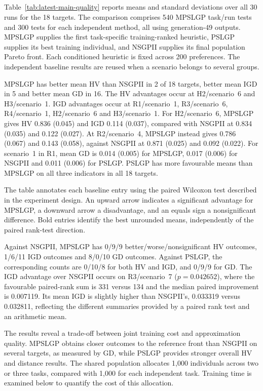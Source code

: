 \subsection{}
Table~\ref{tab:latest-main-quality} reports means and standard deviations over all 30 runs for the 18 targets. The comparison comprises 540 MPSLGP task/run tests and 300 tests for each independent method, all using generation-49 outputs. MPSLGP supplies the first task-specific training-ranked heuristic, PSLGP supplies its best training individual, and NSGPII supplies its final population Pareto front. Each conditioned heuristic is fixed across 200 preferences. The independent baseline results are reused when a scenario belongs to several groups.

MPSLGP has better mean HV than NSGPII in 2 of 18 targets, better mean IGD in 5 and better mean GD in 16. The HV advantages occur at H2/scenario~6 and H3/scenario~1. IGD advantages occur at R1/scenario~1, R3/scenario~6, R4/scenario~1, H2/scenario~6 and H3/scenario~1. For H2/scenario~6, MPSLGP gives HV 0.836 (0.045) and IGD 0.114 (0.037), compared with NSGPII at 0.834 (0.035) and 0.122 (0.027). At R2/scenario~4, MPSLGP instead gives 0.786 (0.067) and 0.143 (0.058), against NSGPII at 0.871 (0.025) and 0.092 (0.022). For scenario~1 in R1, mean GD is 0.014 (0.005) for MPSLGP, 0.017 (0.006) for NSGPII and 0.011 (0.006) for PSLGP. PSLGP has more favourable means than MPSLGP on all three indicators in all 18 targets.

The table annotates each baseline entry using the paired Wilcoxon test described in the experiment design. An upward arrow indicates a significant advantage for MPSLGP, a downward arrow a disadvantage, and an equals sign a nonsignificant difference. Bold entries identify the best unrounded means, independently of the paired rank-test direction.

Against NSGPII, MPSLGP has 0/9/9 better/worse/nonsignificant HV outcomes, 1/6/11 IGD outcomes and 8/0/10 GD outcomes. Against PSLGP, the corresponding counts are 0/10/8 for both HV and IGD, and 0/9/9 for GD. The IGD advantage over NSGPII occurs on R3/scenario~7 ($p=0.042652$), where the favourable paired-rank sum is 331 versus 134 and the median paired improvement is 0.007119. Its mean IGD is slightly higher than NSGPII's, 0.033319 versus 0.032811, reflecting the different summaries provided by a paired rank test and an arithmetic mean.

The results reveal a trade-off between joint training cost and approximation quality. MPSLGP obtains closer outcomes to the reference front than NSGPII on several targets, as measured by GD, while PSLGP provides stronger overall HV and distance results. The shared population allocates 1,000 individuals across two or three tasks, compared with 1,000 for each independent task. Training time is examined below to quantify the cost of this allocation.

